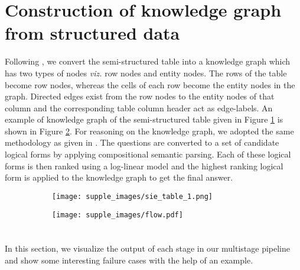\documentclass[10pt,twocolumn,letterpaper]{article}
\begin{document}
\section{Construction of knowledge graph from structured data} \label{kg_creation} 
Following \cite{PasupatL15}, we convert the semi-structured table into a knowledge graph which has two types of nodes \textit{viz.} row nodes and entity nodes. The rows of the table become row nodes, whereas the cells of each row become the entity nodes in the graph. Directed edges exist from the row nodes to the entity nodes of that column and the corresponding table column header act as edge-labels. An example of knowledge graph of the semi-structured table given in Figure \ref{fig:sie_table} is shown in Figure \ref{fig:flow}. For reasoning on the knowledge graph, we adopted the same methodology as given in \cite{PasupatL15}. The questions are converted to a set of candidate logical forms by applying compositional semantic parsing. Each of these logical forms is then ranked using a log-linear model and the highest ranking logical form is applied to the knowledge graph to get the final answer. 



\begin{figure}[h]
\centering
\begin{subfigure}{.45\textwidth}
\centering
\texttt{[image: supple\_images/sie\_table\_1.png]}
\caption{}
\label{fig:sie_table}
\end{subfigure}
\begin{subfigure}{.45\textwidth}
\centering
\texttt{[image: supple\_images/flow.pdf]}
\caption{}
\label{fig:flow}
\end{subfigure}
\caption{}
\label{KG}
\end{figure}

\section{}
\label{failure_cases}

In this section, we visualize the output of each stage in our multistage pipeline and show some interesting failure cases with the help of an example.
\end{document}
